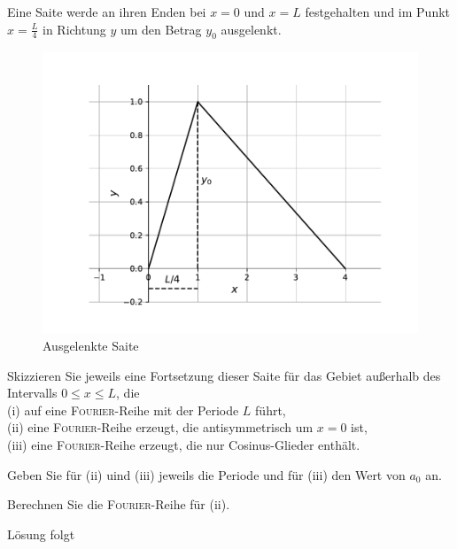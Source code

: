 \documentclass{atistandalonetask}
\begin{document}
  \begin{atiTask}[
    title = Auslenkung einer Seite
  ]
	Eine Saite werde an ihren Enden bei $x=0$ und $x=L$ festgehalten und im Punkt $x=\frac{L}{4}$ in Richtung $y$ um den Betrag $y_0$ ausgelenkt.
	\begin{figure}[H]
	\centering
	\includegraphics[width=0.70\linewidth]{picture-fourier_iv}
	\caption{Ausgelenkte Saite}
	\end{figure}

	\begin{atiSubtasks}
		\item
		Skizzieren Sie jeweils eine Fortsetzung dieser Saite für das Gebiet außerhalb des Intervalls $0\leq x\leq L$, die  \\
		(i) auf eine \textsc{Fourier}-Reihe mit der Periode $L$ führt,\\
		(ii) eine \textsc{Fourier}-Reihe erzeugt, die antisymmetrisch um $x=0$ ist,\\
		(iii) eine \textsc{Fourier}-Reihe erzeugt, die nur Cosinus-Glieder enthält.
		
		\item Geben Sie für (ii) uind (iii) jeweils die Periode und für (iii) den Wert von $a_0$ an.
		\item Berechnen Sie die \textsc{Fourier}-Reihe für (ii). 		
	\end{atiSubtasks} 
  \end{atiTask}
  \begin{atiSolution}
   Lösung folgt
  \end{atiSolution}
\end{document}
